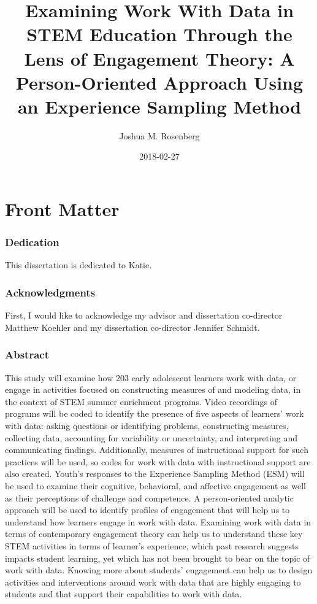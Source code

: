 \documentclass[]{book}
\title{Examining Work With Data in STEM Education Through the Lens of
Engagement Theory: A Person-Oriented Approach Using an Experience
Sampling Method}
\author{Joshua M. Rosenberg}
\date{2018-02-27}
\theoremstyle{definition}
\theoremstyle{definition}
\theoremstyle{definition}
\theoremstyle{remark}
\begin{document}
\maketitle

{
\setcounter{tocdepth}{1}
\tableofcontents
}
\chapter{Front Matter}\label{front-matter}

\subsection{Dedication}\label{dedication}

This dissertation is dedicated to Katie.

\subsection{Acknowledgments}\label{acknowledgments}

First, I would like to acknowledge my advisor and dissertation
co-director Matthew Koehler and my dissertation co-director Jennifer
Schmidt.

\subsection{Abstract}\label{abstract}

This study will examine how 203 early adolescent learners work with
data, or engage in activities focused on constructing measures of and
modeling data, in the context of STEM summer enrichment programs. Video
recordings of programs will be coded to identify the presence of five
aspects of learners' work with data: asking questions or identifying
problems, constructing measures, collecting data, accounting for
variability or uncertainty, and interpreting and communicating findings.
Additionally, measures of instructional support for such practices will
be used, so codes for work with data with instructional support are also
created. Youth's responses to the Experience Sampling Method (ESM) will
be used to examine their cognitive, behavioral, and affective engagement
as well as their perceptions of challenge and competence. A
person-oriented analytic approach will be used to identify profiles of
engagement that will help us to understand how learners engage in work
with data. Examining work with data in terms of contemporary engagement
theory can help us to understand these key STEM activities in terms of
learner's experience, which past research suggests impacts student
learning, yet which has not been brought to bear on the topic of work
with data. Knowing more about students' engagement can help us to design
activities and interventions around work with data that are highly
engaging to students and that support their capabilities to work with
data.
\end{document}
